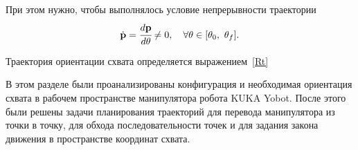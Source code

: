 При этом нужно, чтобы выполнялось условие непрерывности траектории
\begin{equation}
	\dot{\mathbf{p}} = \cfrac{d \mathbf{p}}{d \theta} \ne 0,
	\quad
	\forall{\theta} \in [\theta_0,\,\,\theta_f].
\end{equation}

Траектория ориентации схвата определяется выражением~\eqref{Rt}

В этом разделе были проанализированы конфигурация и необходимая ориентация схвата в рабочем пространстве манипулятора робота KUKA Yobot. После этого были решены задачи планирования траекторий для перевода манипулятора из точки в точку, для обхода последовательности точек и для задания закона движения в пространстве координат схвата.



\newpage



